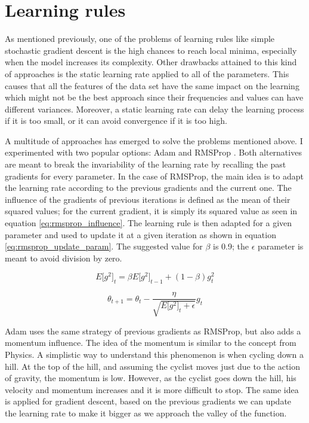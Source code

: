 \documentclass{article}
\begin{document}
\section{Learning rules}
As mentioned previously, one of the problems of learning rules like simple stochastic gradient descent is the high chances to reach local minima, especially when the model increases its complexity. Other drawbacks attained to this kind of approaches is the static learning rate applied to all of the parameters. This causes that all the features of the data set have the same impact on the learning which might not be the best approach since their frequencies and values can have different variances. Moreover, a static learning rate can delay the learning process if it is too small, or it can avoid convergence if it is too high.

A multitude of approaches has emerged to solve the problems mentioned above. I experimented with two popular options: Adam \citep{kingma2014adam} and RMSProp \citep{tieleman2012rmsprop}. Both alternatives are meant to break the invariability of the learning rate by recalling the past gradients for every parameter. In the case of RMSProp, the main idea is to adapt the learning rate according to the previous gradients and the current one. The influence of the gradients of previous iterations is defined as the mean of their squared values; for the current gradient, it is simply its squared value as seen in equation \ref{eq:rmsprop_influence}. The learning rule is then adapted for a given parameter and used to update it at a given iteration as shown in equation \ref{eq:rmsprop_update_param}. The suggested value for $\beta$ is 0.9; the $\epsilon$ parameter is meant to avoid division by zero.

\begin{equation}
	E\lbrack g^2 \rbrack_t = \beta E\lbrack g^2 \rbrack_{t-1} + (1 - \beta) g_t^2
	\label{eq:rmsprop_influence}
\end{equation}

\begin{equation}
	\theta_{t+1} = \theta_t - \frac{\eta}{\sqrt{E\lbrack g^2 \rbrack_t + \epsilon}} g_t
	\label{eq:rmsprop_update_param}
\end{equation}

Adam uses the same strategy of previous gradients as RMSProp, but also adds a momentum influence. The idea of the momentum is similar to the concept from Physics. A simplistic way to understand this phenomenon is when cycling down a hill. At the top of the hill, and assuming the cyclist moves just due to the action of gravity, the momentum is low. However, as the cyclist goes down the hill, his velocity and momentum increases and it is more difficult to stop. The same idea is applied for gradient descent, based on the previous gradients we can update the learning rate to make it bigger as we approach the valley of the function.
\end{document}

